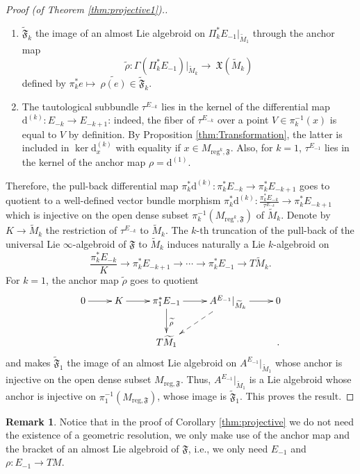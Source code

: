 \documentclass[10pt]{article}
\theoremstyle{plain}
\theoremstyle{definition}
\newtheorem{remark}[lemma]{Remark}
\theoremstyle{remark}
\newcommand{\dd}{\mathrm{d}}
\begin{document}
\begin{proof}[Proof (of Theorem \ref{thm:projective1}).]
\begin{enumerate}
     \item $\widetilde{\mathfrak F}_k$ the image of an almost Lie algebroid on $\Pi_k^*E_{-1}|_{\widetilde M_1}$ through the anchor map $$\widetilde\rho\colon\Gamma(\Pi_k^*E_{-1})|_{\widetilde M_k}\longrightarrow ~\mathfrak X(\widetilde M_k)$$ defined by $ \pi_k^*e\longmapsto~\widetilde{\rho(e)}\in \widetilde{\mathfrak F}_k$.
     \item  The tautological subbundle $\tau^{E_{-k}}$ lies in the kernel of the differential map $\dd^{(k)}\colon E_{-k}\to E_{-k+1}$: indeed, the fiber of $\tau^{E_{-k}}$ over a point $V\in \pi^{-1}_k(x)$ is equal to $V$ by definition. By Proposition \ref{thm:Transformation}, the latter is included in $\ker\dd^{(k)}_x$ with equality if  $x\in M_{\mathrm{reg}^{k}, \mathfrak F}$. Also, for $k=1$, $\tau^{E_{-1}}$ lies in the kernel of the anchor map $\rho=\dd^{(1)}$.
\end{enumerate}   
Therefore, the pull-back differential map $\pi_k^*\dd^{(k)}\colon \pi_k^*E_{-k}\to \pi_k^*E_{-k+1}$ goes to quotient to a well-defined vector bundle morphism $\pi_k^*\dd^{(k)}\colon \frac{\pi_k^*E_{-k}}{\tau^{E_{-k}}}\longrightarrow \pi_k^*E_{-k+1}$ which is injective on  the open dense subset $\pi_k^{-1}(M_{\mathrm{reg}^k,\mathfrak F})$ of $\widetilde M_k$. Denote by $K\to \widetilde M_k$ the restriction of $\tau^{E_{-k}}$ to $\widetilde M_k$. The $k$-th truncation of the pull-back of  the universal Lie $\infty$-algebroid of $\mathfrak F$ to $\widetilde M_k$ induces naturally a Lie $k$-algebroid on $$\frac{\pi_k^*E_{-k}}{K}\longrightarrow \pi_k^*E_{-k+1}\longrightarrow \cdots \longrightarrow \pi_k^*E_{-1}\longrightarrow T\widetilde M_k.$$ For $k=1$, the anchor map $\widetilde \rho$ goes to quotient
\begin{equation}
 \xymatrix{0\ar[r] &K\ar[r]&\pi_1^*E_{-1}\ar[r]\ar[d]^{\widetilde \rho} &A^{E_{-1}}|_{\widetilde M_k}\ar[r]\ar@{-->}[ld]&0\\& &T\widetilde M_1 & &.}
 \end{equation}and makes $\widetilde{\mathfrak F}_1$ the image of an almost Lie algebroid on $A^{E_{-1}}|_{\widetilde M_1}$ whose anchor is injective on the open dense subset $M_{\mathrm{reg},\mathfrak F}$. Thus, $A^{E_{-1}}|_{\widetilde M_1}$ is a Lie algebroid whose anchor is injective on $\pi_1^{-1}(M_{\mathrm{reg}, \mathfrak F})$, whose image is $\widetilde{\mathfrak F}_1$. This proves the result.
\end{proof}
\begin{remark}
    Notice that in the proof of Corollary \ref{thm:projective} we do not need the existence of a geometric resolution, we only make use of the anchor map and the bracket of an  almost Lie algebroid of $\mathfrak F$, i.e., we only need $E_{-1}$ and $\rho\colon E_{-1}\longrightarrow TM$.
\end{remark}
\end{document}
